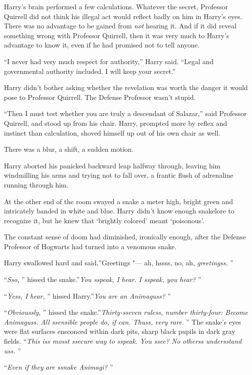Harry's brain performed a few calculations. Whatever the secret,
Professor Quirrell did not think his illegal act would reflect badly on
him in Harry's eyes. There was no advantage to be gained from \emph{not}
hearing it. And if it did reveal something wrong with Professor
Quirrell, then it was very much to Harry's advantage to know it, even if
he had promised not to tell anyone.

``I never had very much respect for authority,'' Harry said. ``Legal and
governmental authority included. I will keep your secret.''

Harry didn't bother asking whether the revelation was worth the danger
it would pose to Professor Quirrell. The Defense Professor wasn't
stupid.

``Then I must test whether you are truly a descendant of Salazar,'' said
Professor Quirrell, and stood up from his chair. Harry, prompted more by
reflex and instinct than calculation, shoved himself up out of his own
chair as well.

There was a blur, a shift, a sudden motion.

Harry aborted his panicked backward leap halfway through, leaving him
windmilling his arms and trying not to fall over, a frantic flush of
adrenaline running through him.

At the other end of the room swayed a snake a meter high, bright green
and intricately banded in white and blue. Harry didn't know enough
snakelore to recognize it, but he knew that `brightly colored' meant
`poisonous'.

The constant sense of doom had diminished, ironically enough, after the
Defense Professor of Hogwarts had turned into a venomous snake.

Harry swallowed hard and said,''Greetings "--- ah, hssss, no, ah,
\emph{greetingss.} ''

``\emph{Sso,} '' hissed the snake.''\emph{You sspeak, I hear. I sspeak,
you hear?} ''

``\emph{Yess, I hear,} '' hissed Harry.''\emph{You are an Animaguss?} ''

``\emph{Obvioussly,} '' hissed the snake.''\emph{Thirty-sseven ruless,
number thirty-four: Become Animaguss. All ssensible people do, if can.
Thuss,} \emph{very rare.} '' The snake's eyes were flat surfaces
ensconced within dark pits, sharp black pupils in dark gray fields.
``\emph{This iss mosst ssecure way to sspeak. You ssee? No otherss
undersstand uss.} ''

``\emph{Even if they are ssnake Animagi?} ''

